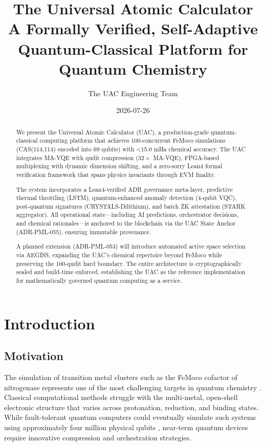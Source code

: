 \documentclass[11pt,a4paper]{article}
\title{The Universal Atomic Calculator\\ A Formally Verified, Self-Adaptive Quantum-Classical Platform for Quantum Chemistry}
\author{The UAC Engineering Team}
\date{2026-07-26}
\begin{document}
\maketitle

\begin{abstract}
We present the Universal Atomic Calculator (UAC), a production-grade quantum-classical computing platform that achieves 100-concurrent FeMoco simulations (CAS(114,114) encoded into 69 qubits) with <15.0 mHa chemical accuracy. The UAC integrates MA-VQE with qudit compression ($32\times$ MA-VQE), FPGA-based multiplexing with dynamic dimension shifting, and a zero-sorry Lean4 formal verification framework that spans physics invariants through EVM finality.

The system incorporates a Lean4-verified ADR governance meta-layer, predictive thermal throttling (LSTM), quantum-enhanced anomaly detection (4-qubit VQC), post-quantum signatures (CRYSTALS-Dilithium), and batch ZK attestation (STARK aggregator). All operational state—including AI predictions, orchestrator decisions, and chemical rationales—is anchored to the blockchain via the UAC State Anchor (ADR-PML-055), ensuring immutable provenance.

A planned extension (ADR-PML-053) will introduce automated active space selection via AEGISS, expanding the UAC's chemical repertoire beyond FeMoco while preserving the 100-qudit hard boundary. The entire architecture is cryptographically sealed and build-time enforced, establishing the UAC as the reference implementation for mathematically governed quantum computing as a service.
\end{abstract}
\newpage
\tableofcontents
\newpage
\section{Introduction}

\subsection{Motivation}
The simulation of transition metal clusters such as the FeMoco cofactor of nitrogenase represents one of the most challenging targets in quantum chemistry \cite{feMocoBenchmark}. Classical computational methods struggle with the multi-metal, open-shell electronic structure that varies across protonation, reduction, and binding states. While fault-tolerant quantum computers could eventually simulate such systems using approximately four million physical qubits \cite{surfaceCodeEstimates}, near-term quantum devices require innovative compression and orchestration strategies.
\end{document}
